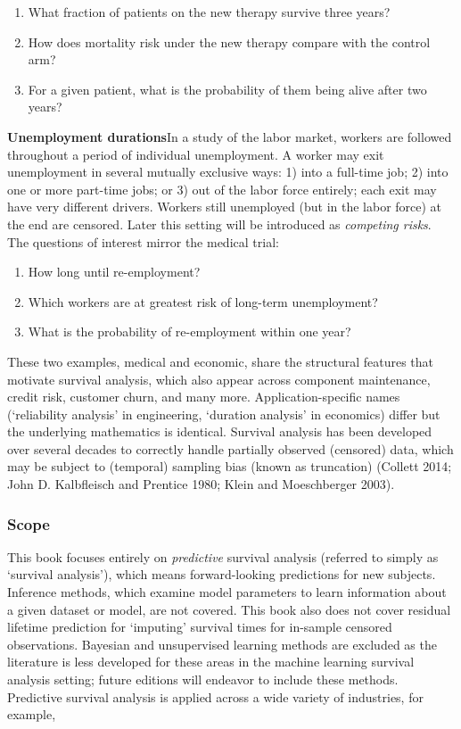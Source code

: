 \documentclass[
  letterpaper,
  krantz2]{style/krantz}
\providecommand{\tightlist}{%
  \setlength{\itemsep}{0pt}\setlength{\parskip}{0pt}}
\begin{document}
\begin{enumerate}
\def\labelenumi{\arabic{enumi}.}
\tightlist
\item
  What fraction of patients on the new therapy survive three years?
\item
  How does mortality risk under the new therapy compare with the control
  arm?
\item
  For a given patient, what is the probability of them being alive after
  two years?
\end{enumerate}

\textbf{Unemployment durations}\newline In a study of the labor market,
workers are followed throughout a period of individual unemployment. A
worker may exit unemployment in several mutually exclusive ways: 1) into
a full-time job; 2) into one or more part-time jobs; or 3) out of the
labor force entirely; each exit may have very different drivers. Workers
still unemployed (but in the labor force) at the end are censored. Later
this setting will be introduced as \emph{competing risks}. The questions
of interest mirror the medical trial:

\begin{enumerate}
\def\labelenumi{\arabic{enumi}.}
\tightlist
\item
  How long until re-employment?
\item
  Which workers are at greatest risk of long-term unemployment?
\item
  What is the probability of re-employment within one year?
\end{enumerate}

These two examples, medical and economic, share the structural features
that motivate survival analysis, which also appear across component
maintenance, credit risk, customer churn, and many more.
Application-specific names (`reliability analysis' in engineering,
`duration analysis' in economics) differ but the underlying mathematics
is identical. Survival analysis has been developed over several decades
to correctly handle partially observed (censored) data, which may be
subject to (temporal) sampling bias (known as truncation) (Collett 2014;
John D. Kalbfleisch and Prentice 1980; Klein and Moeschberger 2003).

\subsubsection*{Scope}

This book focuses entirely on \emph{predictive} survival analysis
(referred to simply as `survival analysis'), which means forward-looking
predictions for new subjects. Inference methods, which examine model
parameters to learn information about a given dataset or model, are not
covered. This book also does not cover residual lifetime prediction for
`imputing' survival times for in-sample censored observations. Bayesian
and unsupervised learning methods are excluded as the literature is less
developed for these areas in the machine learning survival analysis
setting; future editions will endeavor to include these methods.
Predictive survival analysis is applied across a wide variety of
industries, for example,
\end{document}

